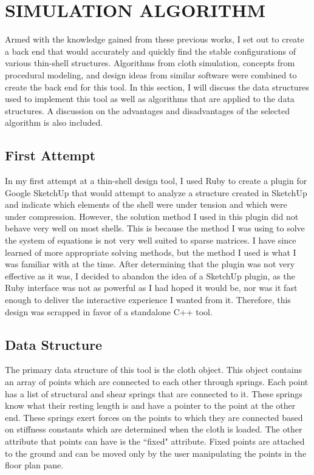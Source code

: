 \documentclass{thesis}
\begin{document}
\chapter{SIMULATION ALGORITHM}
Armed with the knowledge gained from these previous works, I set out to create a back end that would accurately
and quickly find the stable configurations of various thin-shell structures.  Algorithms from cloth simulation,
concepts from procedural modeling, and design ideas from similar software were combined to create the back end for
this tool.  In this section, I will discuss the data structures used to implement this tool as well as algorithms
that are applied to the data structures.  A discussion on the advantages and disadvantages of the selected algorithm
is also included.

\section{First Attempt}
\label{sec:initial}
In my first attempt at a thin-shell design tool, I used Ruby to create a plugin for Google SketchUp that would attempt to analyze
a structure created in SketchUp and indicate which elements of the shell were under tension and which were under compression.
However, the solution method I used in this plugin did not behave very well on most shells.  This is because the method I was
using to solve the system of equations is not very well suited to sparse matrices.  I have since learned of more appropriate
solving methods, but the method I used is what I was familiar with at the time.  After determining that the plugin was not
very effective as it was, I decided to abandon the idea of a SketchUp plugin, as the Ruby interface was not as powerful as I had
hoped it would be, nor was it fast enough to deliver the interactive experience I wanted from it.  Therefore, this design was
scrapped in favor of a standalone C++ tool.

\section{Data Structure}
The primary data structure of this tool is the cloth object.  This object contains an array of points which are connected to each
other through springs. Each point has a list of structural and shear springs that are connected to it.  These springs know what
their resting length is and have a pointer to the point at the other end.  These springs exert forces on the points to which they
are connected based on stiffness constants which are determined when the cloth is loaded.  The other attribute that points can
have is the ``fixed" attribute.  Fixed points are attached to the ground and can be moved only by the user manipulating the
points in the floor plan pane.
\end{document}
